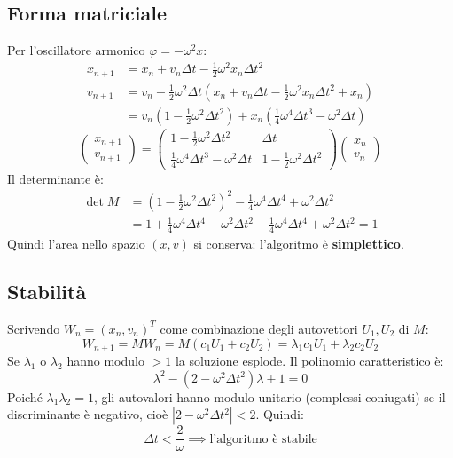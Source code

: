 \documentclass[11pt, a4paper, openright]{book}
\theoremstyle{plain}
\theoremstyle{definition}
\theoremstyle{remark}
\begin{document}
\subsection{Forma matriciale}
Per l'oscillatore armonico $\varphi = -\omega^2x$:
\begin{align}
    x_{n + 1} &= x_n + v_n\Delta t - \frac{1}{2}\omega^2x_n\Delta t^2 \\
    v_{n + 1} &= v_n - \frac{1}{2}\omega^2\Delta t\left(x_n + v_n\Delta t - \frac{1}{2}\omega^2x_n\Delta t^2 + x_n\right) \\
    &= v_n\left(1 - \frac{1}{2}\omega^2\Delta t^2\right) + x_n\left(\frac{1}{4}\omega^4\Delta t^3 - \omega^2\Delta t\right)
\end{align}
\begin{equation}
    \begin{pmatrix} x_{n + 1} \\ v_{n + 1}\end{pmatrix} = \begin{pmatrix} 1 - \frac{1}{2}\omega^2\Delta t^2 & \Delta t \\ \frac{1}{4}\omega^4\Delta t^3 - \omega^2\Delta t & 1 - \frac{1}{2}\omega^2\Delta t^2\end{pmatrix}\begin{pmatrix} x_n \\ v_n\end{pmatrix}
\end{equation}
Il determinante è:
\begin{align}
    \det M &= \left(1 - \frac{1}{2}\omega^2\Delta t^2\right)^2 - \frac{1}{4}\omega^4\Delta t^4 + \omega^2\Delta t^2 \\
    &= 1 + \frac{1}{4}\omega^4\Delta t^4 - \omega^2\Delta t^2 - \frac{1}{4}\omega^4\Delta t^4 + \omega^2\Delta t^2 = 1
\end{align}
Quindi l'area nello spazio $(x, v)$ si conserva: l'algoritmo è \textbf{simplettico}.

\subsection{Stabilità}
Scrivendo $W_n = (x_n, v_n)^T$ come combinazione degli autovettori $U_1, U_2$ di $M$:
\begin{equation}
    W_{n + 1} = MW_n = M\left(c_1U_1 + c_2U_2\right) = \lambda_1c_1U_1 + \lambda_2c_2U_2
\end{equation}
Se $\lambda_1$ o $\lambda_2$ hanno modulo $> 1$ la soluzione esplode. Il polinomio caratteristico è:
\begin{equation}
    \lambda^2 - \left(2 - \omega^2\Delta t^2\right)\lambda + 1 = 0
\end{equation}
Poiché $\lambda_1\lambda_2 = 1$, gli autovalori hanno modulo unitario (complessi coniugati) se il discriminante è negativo, cioè $|2 - \omega^2\Delta t^2| < 2$. Quindi:
\begin{equation}
    \Delta t < \frac{2}{\omega} \implies \text{l'algoritmo è stabile}
\end{equation}
\end{document}
